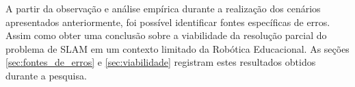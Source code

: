 A partir da observação e análise empírica durante a realização dos cenários apresentados anteriormente, foi possível identificar
fontes específicas de erros. Assim como obter uma conclusão sobre a viabilidade da resolução parcial do problema de SLAM em um contexto
limitado da Robótica Educacional. As seções \ref{sec:fontes_de_erros} e \ref{sec:viabilidade} registram estes resultados obtidos durante
a pesquisa.
